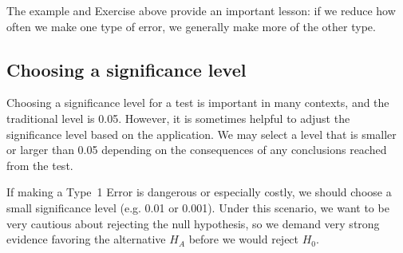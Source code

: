 

The example and Exercise above provide an important lesson: if we reduce how often we make one type of error, we generally make more of the other type.



\subsection{Choosing a significance level}
\label{significanceLevel}


Choosing a significance level for a test is important in many contexts, and the traditional level is 0.05. However, it is sometimes helpful to adjust the significance level based on the application. We may select a level that is smaller or larger than 0.05 depending on the consequences of any conclusions reached from the test.

If making a Type~1 Error is dangerous or especially costly, we should choose a small significance level (e.g. 0.01 or 0.001). Under this scenario, we want to be very cautious about rejecting the null hypothesis, so we demand very strong evidence favoring the alternative $H_A$ before we would reject $H_0$.

